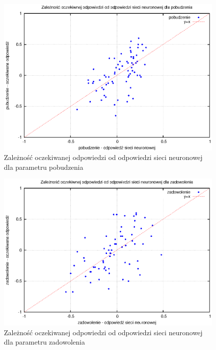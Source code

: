 \begin{figure}[ht!]
\centering
\includegraphics[scale=\imageSize]{res/arousal2.eps}
\caption{Zależność oczekiwanej odpowiedzi od odpowiedzi sieci neuronowej dla parametru pobudzenia\label{arousal2}}
\end{figure}

\begin{figure}[ht!]
\centering
\includegraphics[scale=\imageSize]{res/valence2.eps}
\caption{Zależność oczekiwanej odpowiedzi od odpowiedzi sieci neuronowej dla parametru zadowolenia\label{valence2}}
\end{figure}





